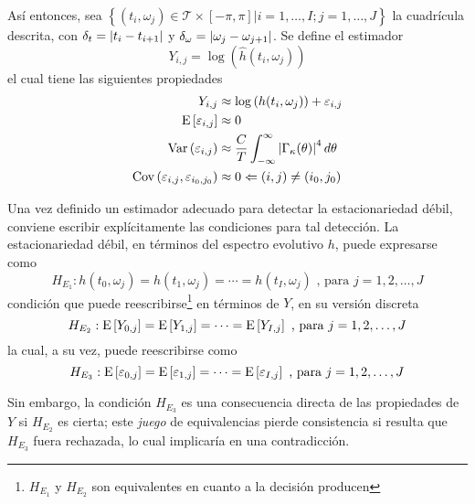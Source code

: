 Así entonces, sea
$\left\{ (t_i,\omega_j) \in \mathcal{T} \times [-\pi,\pi] | i = 1,\dots,I ; j=1,\dots,J \right\}$
la cuadrícula descrita, con $\delta_t= \left| t_i - t_{i+1} \right|$ y 
$\delta_\omega = \left| \omega_j-\omega_{j+1} \right|$. 
%
Se define el estimador
\begin{equation}
Y_{i,j} = \log\left(\widehat{h}(t_i,\omega_j)\right)
\end{equation}
%
el cual tiene las siguientes propiedades
%
\begin{align*}
Y_{i,j} &\approx \log\left(h(t_i,\omega_j)\right) + \varepsilon_{i,j} \\
\mathrm{E}\left[ \varepsilon_{i,j} \right] &\approx 0 \\
\mathrm{Var}\left( \varepsilon_{i,j} \right) &\approx
\frac{C}{T} \int_{-\infty}^{\infty} \left| \Gamma_\kappa(\theta) \right|^{4} d\theta \\
\mathrm{Cov}\left( \varepsilon_{i,j},\varepsilon_{i_0,j_0} \right) &\approx 0 
\Leftarrow (i,j)\neq (i_0,j_0)
\end{align*}


Una vez definido un estimador adecuado para detectar la estacionariedad débil, conviene escribir
explícitamente las condiciones para tal detección.
%
La estacionariedad débil, en términos del espectro evolutivo $h$, puede expresarse como
%
\begin{equation*}
H_{E_1} : h(t_0,\omega_j) = h(t_1,\omega_j) = \cdots = h(t_I,\omega_j)
\text{ , para } j = 1, 2, \dots , J
\end{equation*}
%
condición que puede reescribirse\footnote{$H_{E_1}$ y $H_{E_2}$ son equivalentes en cuanto a la
decisión producen} en términos de $Y$, en su versión discreta
%
\begin{equation*}
H_{E_2} : \mathrm{E}\left[ Y_{0,j} \right] = \mathrm{E}\left[ Y_{1,j} \right] = \cdots = \mathrm{E}\left[ Y_{I,j} \right] \text{ , para } j = 1, 2, \dots , J
\end{equation*}
%
la cual, a su vez, puede reescribirse como
\begin{equation*}
H_{E_3} : \mathrm{E}\left[ \varepsilon_{0,j} \right] = \mathrm{E}\left[ \varepsilon_{1,j} \right] = \cdots =
\mathrm{E}\left[ \varepsilon_{I,j} \right] \text{ , para } j = 1, 2, \dots , J
\end{equation*}

Sin embargo, la condición $H_{E_3}$ es una consecuencia directa de las propiedades de $Y$ si
$H_{E_2}$ es cierta; este \textit{juego} de equivalencias pierde consistencia si resulta que
$H_{E_3}$ fuera rechazada, lo cual implicaría en una contradicción.

